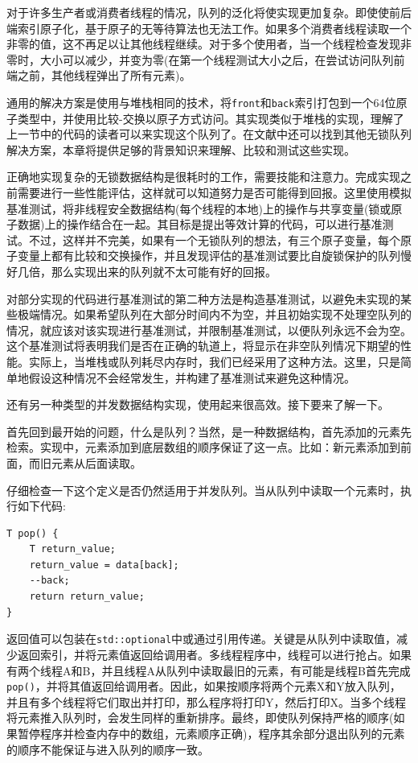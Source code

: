 对于许多生产者或消费者线程的情况，队列的泛化将使实现更加复杂。即使使前后端索引原子化，基于原子的无等待算法也无法工作。如果多个消费者线程读取一个非零的值，这不再足以让其他线程继续。对于多个使用者，当一个线程检查发现非零时，大小可以减少，并变为零(在第一个线程测试大小之后，在尝试访问队列前端之前，其他线程弹出了所有元素)。

通用的解决方案是使用与堆栈相同的技术，将\texttt{front}和\texttt{back}索引打包到一个64位原子类型中，并使用比较-交换以原子方式访问。其实现类似于堆栈的实现，理解了上一节中的代码的读者可以来实现这个队列了。在文献中还可以找到其他无锁队列解决方案，本章将提供足够的背景知识来理解、比较和测试这些实现。

正确地实现复杂的无锁数据结构是很耗时的工作，需要技能和注意力。完成实现之前需要进行一些性能评估，这样就可以知道努力是否可能得到回报。这里使用模拟基准测试，将非线程安全数据结构(每个线程的本地)上的操作与共享变量(锁或原子数据)上的操作结合在一起。其目标是提出等效计算的代码，可以进行基准测试。不过，这样并不完美，如果有一个无锁队列的想法，有三个原子变量，每个原子变量上都有比较和交换操作，并且发现评估的基准测试要比自旋锁保护的队列慢好几倍，那么实现出来的队列就不太可能有好的回报。

对部分实现的代码进行基准测试的第二种方法是构造基准测试，以避免未实现的某些极端情况。如果希望队列在大部分时间内不为空，并且初始实现不处理空队列的情况，就应该对该实现进行基准测试，并限制基准测试，以便队列永远不会为空。这个基准测试将表明我们是否在正确的轨道上，将显示在非空队列情况下期望的性能。实际上，当堆栈或队列耗尽内存时，我们已经采用了这种方法。这里，只是简单地假设这种情况不会经常发生，并构建了基准测试来避免这种情况。

还有另一种类型的并发数据结构实现，使用起来很高效。接下要来了解一下。


首先回到最开始的问题，什么是队列？当然，是一种数据结构，首先添加的元素先检索。实现中，元素添加到底层数组的顺序保证了这一点。比如：新元素添加到前面，而旧元素从后面读取。

仔细检查一下这个定义是否仍然适用于并发队列。当从队列中读取一个元素时，执行如下代码:

\begin{lstlisting}[style=styleCXX]
T pop() {
	T return_value;
	return_value = data[back];
	--back;
	return return_value;
}
\end{lstlisting}

返回值可以包装在\texttt{std::optional}中或通过引用传递。关键是从队列中读取值，减少返回索引，并将元素值返回给调用者。多线程程序中，线程可以进行抢占。如果有两个线程A和B，并且线程A从队列中读取最旧的元素，有可能是线程B首先完成\texttt{pop()}，并将其值返回给调用者。因此，如果按顺序将两个元素X和Y放入队列，并且有多个线程将它们取出并打印，那么程序将打印Y，然后打印X。当多个线程将元素推入队列时，会发生同样的重新排序。最终，即使队列保持严格的顺序(如果暂停程序并检查内存中的数组，元素顺序正确)，程序其余部分退出队列的元素的顺序不能保证与进入队列的顺序一致。


